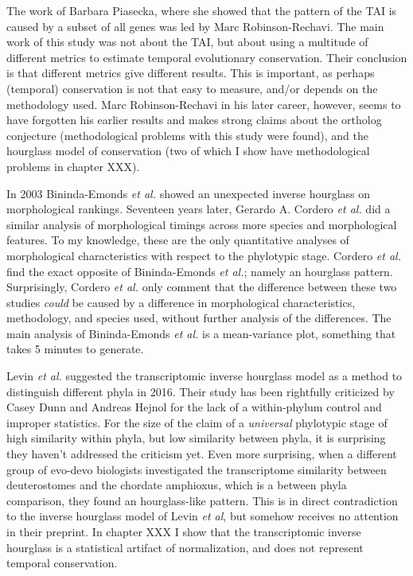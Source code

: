 The work of Barbara Piasecka, where she showed that the pattern of the TAI is caused by a subset of all genes was led by Marc Robinson-Rechavi. The main work of this study was not about the TAI, but about using a multitude of different metrics to estimate temporal evolutionary conservation. Their conclusion is that different metrics give different results. This is important, as perhaps (temporal) conservation is not that easy to measure, and/or depends on the methodology used. Marc Robinson-Rechavi in his later career, however, seems to have forgotten his earlier results and makes strong claims about the ortholog conjecture\cite{KryuchkovaMostacci2016} (methodological problems with this study were found\cite{Dunn2018}), and the hourglass model of conservation\cite{Liu2020,Liu2021,marletaz2018} (two of which I show have methodological problems in chapter XXX). 

In 2003 Bininda-Emonds \textit{et al.} showed an unexpected inverse hourglass on morphological rankings\cite{OlafRP2003}. Seventeen years later, Gerardo A. Cordero \textit{et al.} did a similar analysis of morphological timings across more species and morphological features\cite{Cordero2020}. To my knowledge, these are the only quantitative analyses of morphological characteristics with respect to the phylotypic stage. Cordero \textit{et al.} find the exact opposite of Bininda-Emonds \textit{et al.}; namely an hourglass pattern. Surprisingly, Cordero \textit{et al.} only comment that the difference between these two studies \textit{could} be caused by a difference in morphological characteristics, methodology, and species used, without further analysis of the differences. The main analysis of Bininda-Emonds \textit{et al.} is a mean-variance plot, something that takes 5 minutes to generate.

Levin \textit{et al.} suggested the transcriptomic inverse hourglass model as a method to distinguish different phyla in 2016\cite{Levin2016}. Their study has been rightfully criticized by Casey Dunn and Andreas Hejnol for the lack of a within-phylum control\cite{hejnol2016} and improper statistics\cite{Dunn2018}. For the size of the claim of a \textit{universal} phylotypic stage of high similarity within phyla, but low similarity between phyla, it is surprising they haven't addressed the criticism yet. Even more surprising, when a different group of evo-devo biologists investigated the transcriptome similarity between deuterostomes and the chordate amphioxus, which is a between phyla comparison, they found an hourglass-like pattern\cite{PerezPosada2022}. This is in direct contradiction to the inverse hourglass model of Levin \textit{et al}, but somehow receives no attention in their preprint. In chapter XXX I show that the transcriptomic inverse hourglass is a statistical artifact of normalization, and does not represent temporal conservation.

